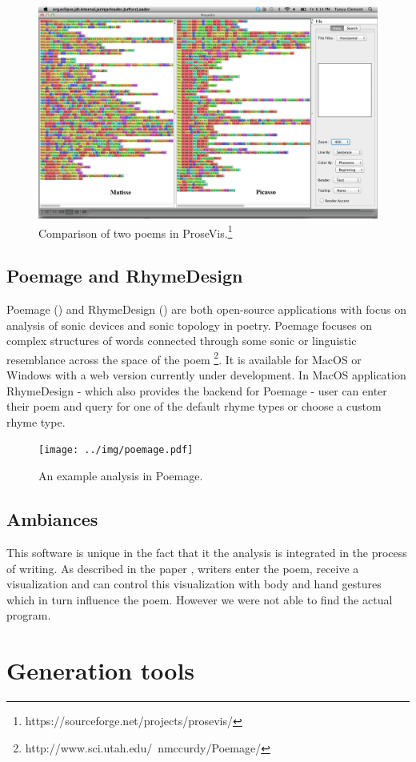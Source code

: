 \begin{figure}[h]\centering
	\includegraphics[scale=0.24]{../img/prosevis.png}
	\caption{Comparison of two poems in ProseVis.\protect\footnote{https://sourceforge.net/projects/prosevis/}}\label{screenshotProsevis}
\end{figure}

\subsection{Poemage and RhymeDesign}
Poemage (\cite{McCurdy2015poemage}) and RhymeDesign (\cite{McCurdy2015}) are both open-source applications with focus on analysis of sonic devices and sonic topology in poetry. Poemage focuses on complex structures of words connected through some sonic or linguistic resemblance across the space of the poem \footnote{http://www.sci.utah.edu/~nmccurdy/Poemage/}. It is available for MacOS or Windows with a web version currently under development. In MacOS application RhymeDesign - which also provides the backend for Poemage - user can enter their poem and query for one of the default rhyme types or choose a custom rhyme type.

\begin{figure}[h]\centering
	\texttt{[image: ../img/poemage.pdf]}
	\caption{An example analysis in Poemage.}\label{screenshotPoemage}
\end{figure}

\subsection{Ambiances}
This software is unique in the fact that it the analysis is integrated in the process of writing. As described in the paper \cite{Meneses2015}, writers enter the poem, receive a visualization and can control this visualization with body and hand gestures which in turn influence the poem. However we were not able to find the actual program.


\section{Generation tools}
